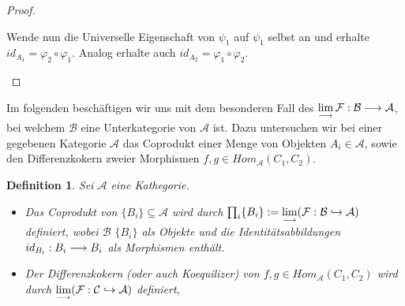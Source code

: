 \documentclass[10pt,a4paper]{report}
\newcommand{\comment}[1]{}
\newtheorem{definition}[satz]{Definition}
\newcommand{\functionfront}[3]{\nolinebreak{#1:#2 \longrightarrow #3}}
\newcommand{\colimes}[0]{\lim\limits_{ \longrightarrow }}
\newcommand{\infunctionfront}[3]{\nolinebreak{#1:#2 \hookrightarrow #3}}
\begin{document}
{\begin{proof}
\comment{$\functionfront{\varphi_1}{\mathcal{A}_1}{\mathcal{A}_2}$ und $\functionfront{\varphi_2}{\mathcal{A}_2}{\mathcal{A}_1}$}
\begin{center}
\end{center}
\begin{flushleft}
Wende nun die Universelle Eigenschaft von $\psi_1$ auf $\psi_1$ selbst an und erhalte $id_{A_1} = \varphi_2 \circ \varphi_1$. Analog erhalte auch $id_{A_2} = \varphi_1 \circ \varphi_2$.
\end{flushleft}
\begin{center}
\end{center}
\end{proof}
Im folgenden beschäftigen wir uns mit dem besonderen Fall des $\colimes \functionfront{\mathcal{F}}{\mathcal{B}}{\mathcal{A}}$, bei welchem $\mathcal{B}$ eine Unterkategorie von $\mathcal{A}$ ist. Dazu untersuchen wir bei einer gegebenen Kategorie $\mathcal{A}$ das Coprodukt einer Menge von Objekten $A_i \in \mathcal{A}$, sowie den Differenzkokern zweier Morphismen $f,g \in Hom_{\mathcal{A}}(C_1,C_2)$.
\begin{definition} \label{altDifferenzkoerndef}
Sei $\mathcal{A}$ eine Kathegorie.\\
\begin{itemize}
\item Das Coprodukt von $ \lbrace B_i \rbrace \subseteq \mathcal{A}$ wird durch $\prod_i \lbrace B_i \rbrace := \colimes(\infunctionfront{\mathcal{F}}{\mathcal{B}}{\mathcal{A}})$ definiert, 
wobei $\mathcal{B}$ $\lbrace B_i \rbrace$ als Objekte und die Identitätsabbildungen $\functionfront{id_{B_i}}{B_i}{B_i}$ als Morphismen enthält.
\item Der Differenzkokern (oder auch Koequilizer) von $f,g \in Hom_{\mathcal{A}}(C_1,C_2)$ wird durch $\colimes(\infunctionfront{\mathcal{F}}{\mathcal{C}}{\mathcal{A}})$ definiert,

\end{itemize}
\end{definition}}
\end{document}
